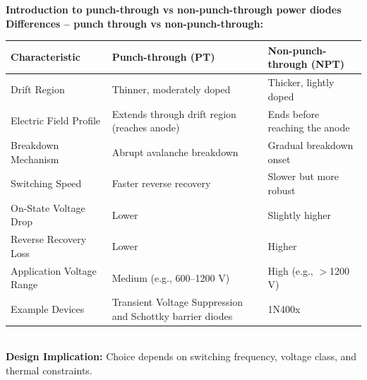 \begin{frame}{\textbf{Introduction to punch-through vs non-punch-through power diodes}}
    \textbf{Differences -- punch through vs non-punch-through:} 
    \centering
    \small
    \begin{tabular}{|p{4cm}|p{4.5cm}|p{4.5cm}|}
    \hline
    \textbf{Characteristic} & \textbf{Punch-through (PT)} & \textbf{Non-punch-through (NPT)} \\
    \hline
    Drift Region & Thinner, moderately doped & Thicker, lightly doped \\
    \hline
    Electric Field Profile & Extends through drift region (reaches anode) & Ends before reaching the anode \\
    \hline
    Breakdown Mechanism & Abrupt avalanche breakdown & Gradual breakdown onset \\
    \hline
    Switching Speed & Faster reverse recovery & Slower but more robust \\
    \hline
    On-State Voltage Drop & Lower & Slightly higher \\
    \hline
    Reverse Recovery Loss & Lower & Higher \\
    \hline
    Application Voltage Range & Medium (e.g., 600–1200 V) & High (e.g., $>$1200 V) \\
    \hline
    Example Devices & Transient Voltage Suppression and Schottky barrier diodes & 1N400x  \\
    \hline
    \end{tabular} \\
    \vspace{0.3cm}
    \textbf{Design Implication:} Choice depends on switching frequency, voltage class, and thermal constraints.
\end{frame}


